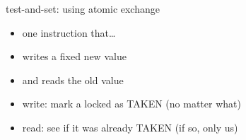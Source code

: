 
\begin{frame}{test-and-set: using atomic exchange}
\begin{itemize}
\item one instruction that\ldots
\item writes a fixed new value
\item and reads the old value
\vspace{.5cm}
\item<2-> write: mark a locked as TAKEN (no matter what)
\item<2-> read: see if it was already TAKEN (if so, only us)
\end{itemize}
\end{frame}

